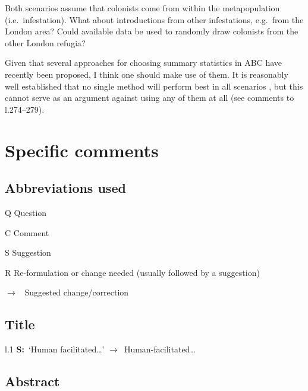 \documentclass[11pt]{article}
\newenvironment{my_description}
{\begin{description}
  \setlength{\itemsep}{2pt}
  \setlength{\parskip}{0pt}
  \setlength{\parsep}{0pt}}
{\end{description}}
\newenvironment{my_enumerate}
{\begin{enumerate}
  \setlength{\itemsep}{2pt}
  \setlength{\parskip}{0pt}
  \setlength{\parsep}{0pt}}
{\end{enumerate}}
\newcommand{\ra}{$\rightarrow$\ }
\newcommand{\V}{\textbf{S:}\ }
\begin{document}
\begin{my_enumerate}
	\item Both scenarios assume that colonists come from within the metapopulation (i.e.\ infestation). What about introductions from other infestations, e.g.\ from the London area? Could available data be used to randomly draw colonists from the other London refugia?
	\item Given that several approaches for choosing summary statistics in ABC have recently been proposed, I think one should make use of them. It is reasonably well established that no single method will perform best in all scenarios \citep{Blum:2012fk}, but this cannot serve as an argument against using any of them at all (see comments to l.274--279).
\end{my_enumerate}
	

\section{Specific comments}

\subsection{Abbreviations used}
\begin{my_description}
	\item[Q] Question
	\item[C] Comment
	\item[S] Suggestion
	\item[R] Re-formulation or change needed (usually followed by a suggestion)
	\item[\ra] Suggested change/correction
\end{my_description}

\subsection{Title}

\begin{my_description}
	\item[l.1] \V `Human facilitated\dots' \ra Human-facilitated\dots
\end{my_description}

\subsection{Abstract}
\end{document}

